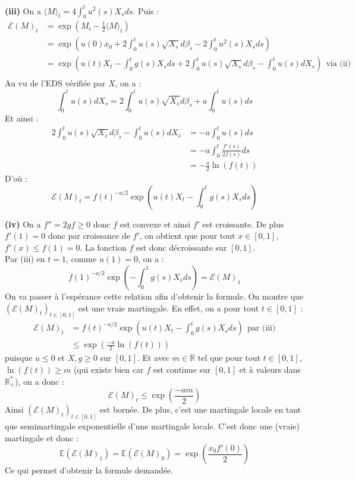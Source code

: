 \documentclass[a4paper,12pt]{article}
\newcommand{\E}{\mathbb{E}}
\newcommand{\sme}{\mathcal{E}}
\begin{document}
\textbf{(iii)} On a $\langle M \rangle_t = 4 \int_0^t u^2(s) X_s ds$. Puis :
\begin{align*}
\sme (M)_t & = \exp{ \left( M_t - \frac{1}{2} \langle M \rangle_t \right) } \\
& = \exp{ \left( u(0)x_0 + 2 \int_0^t u(s) \sqrt{X_s} d \beta_s - 2 \int_0^t u^2(s) X_s d s \right) } \\
& = \exp{ \left( u(t)X_t - \int_0^t g(s) X_s ds + 2 \int_0^t u(s) \sqrt{X_s}d \beta_s - \int_0^t u(s) dX_s \right) } \ \ \text{via (ii)} \\
\end{align*}
Au vu de l'EDS vérifiée par $X$, on a :
$$\int_0^t u(s) dX_s = 2 \int_0^t u(s) \sqrt{X_s} d \beta_s + a \int_0^t u(s)ds$$
Et ainsi :
\begin{align*}
2 \int_0^t u(s)  \sqrt{X_s} d \beta_s - \int_0^t u(s) dX_s & = -a\int_0^t u(s) ds \\
& = -a \int_0^t \frac{f'(s)}{2f(s)} ds  \\
& = -\frac{a}{2} \ln (f(t))
\end{align*}
D'où :
$$\sme (M)_t = f(t)^{-a/2} \exp{\left( u(t) X_t - \int_0^t g(s) X_s ds \right)}$$

\textbf{(iv)} On a $f''=2gf \geq 0$ donc $f$ est convexe et ainsi $f'$ est croissante. De plus $f'(1)=0$ donc par croissance de $f'$, on obtient que pour tout $x \in [0,1]$, $f'(x) \leq f(1)=0$. La fonction $f$ est donc décroissante sur $[0,1]$. \\

Par (iii) en $t=1$, comme $u(1)=0$, on a :
$$f(1)^{-a/2} \exp{\left( -\int_0^1 g(s) X_s ds \right)} = \sme (M)_1$$
On va passer à l'espérance cette relation afin d'obtenir la formule. On montre que $(\sme (M)_t)_{t \in [0,1]}$ est une vraie martingale. En effet, on a pour tout $t \in [0,1]$ :
\begin{align*}
\sme (M)_t & = f(t)^{-a/2} \exp{\left( u(t) X_t - \int_0^t g(s) X_s ds \right)} \ \ \text{par (iii)} \\
& \leq \exp{\left( \frac{-a}{2} \ln(f(t)) \right) }
\end{align*}
puisque $u \leq 0$ et $X, g \geq 0$ sur $[0,1]$. Et avec $m \in \mathbb{R}$ tel que pour tout $t \in [0,1]$, $\ln (f(t)) \geq m$ (qui existe bien car $f$ est continue sur $[0,1]$ et à valeurs dans $\mathbb{R}_+^*$), on a donc :
$$\sme (M)_t \leq \exp{\left( \frac{-am}{2} \right) }$$
Ainsi $(\sme(M)_t)_{t \in [0,1]}$ est bornée. De plus, c'est une martingale locale en tant que semimartingale exponentielle d'une martingale locale. C'est donc une (vraie) martingale et donc :
$$\E \left( \sme (M)_1 \right) = \E (\sme (M)_0) = \exp{\left( \frac{x_0 f'(0)}{2} \right)}$$
Ce qui permet d'obtenir la formule demandée.  \\
\end{document}
